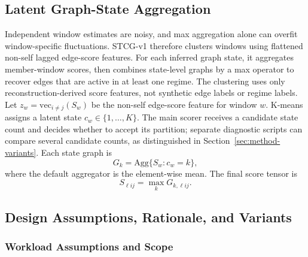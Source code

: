 \documentclass[sigconf,anonymous]{acmart}
\begin{document}
\subsection{Latent Graph-State Aggregation}

Independent window estimates are noisy, and max aggregation alone can overfit window-specific fluctuations.
STCG-v1 therefore clusters windows using flattened non-self lagged edge-score features.
For each inferred graph state, it aggregates member-window scores, then combines state-level graphs by a max operator to recover edges that are active in at least one regime.
The clustering uses only reconstruction-derived score features, not synthetic edge labels or regime labels.
Let $z_w=\mathrm{vec}_{i\neq j}(S_w)$ be the non-self edge-score feature for window $w$.
K-means assigns a latent state $c_w \in \{1,\ldots,K\}$.
The main scorer receives a candidate state count and decides whether to accept its partition; separate diagnostic scripts can compare several candidate counts, as distinguished in Section~\ref{sec:method-variants}.
Each state graph is
\[
G_k = \mathrm{Agg}\{S_w: c_w=k\},
\]
where the default aggregator is the element-wise mean.
The final score tensor is
\[
S_{\ell i j} = \max_k G_{k,\ell i j}.
\]

\subsection{Design Assumptions, Rationale, and Variants}
\label{sec:method-design}

\subsubsection{Workload Assumptions and Scope}
\label{sec:method-assumptions}
\end{document}
